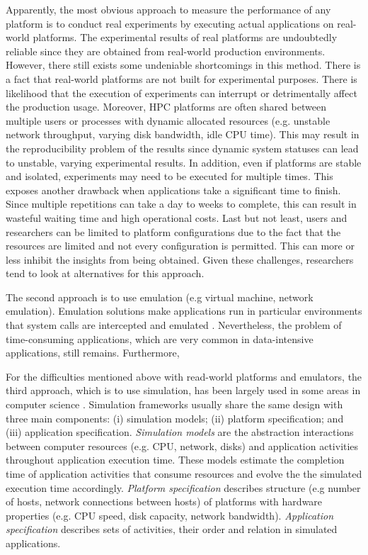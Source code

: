 Apparently, the most obvious approach to measure the performance 
of any platform is to conduct real experiments by executing actual 
applications on real-world platforms. 
The experimental results of real platforms are undoubtedly reliable 
since they are obtained from real-world production environments. 
However, there still exists some undeniable shortcomings in this method. 
There is a fact that real-world platforms are not built for 
experimental purposes. 
There is likelihood that the execution of experiments can interrupt 
or detrimentally affect the production usage. 
Moreover, HPC platforms are often shared between multiple users or processes 
with dynamic allocated resources (e.g. unstable network throughput,  
varying disk bandwidth, idle CPU time). 
This may result in the reproducibility problem of the results since 
dynamic system statuses can lead to unstable, varying experimental results. 
In addition, even if platforms are stable and isolated, experiments may need 
to be executed for multiple times. 
This exposes another drawback when applications take a significant time 
to finish. Since multiple repetitions can take a day to weeks to complete, 
this can result in wasteful waiting time and high operational costs.  
Last but not least, users and researchers can be limited to platform 
configurations due to the fact that the resources are limited and 
not every configuration is permitted. This can more or less 
inhibit the insights from being obtained. 
Given these challenges, researchers tend to look at alternatives 
for this approach. 

The second approach is to use emulation (e.g virtual machine, 
network emulation). Emulation solutions make applications run 
in particular environments that system calls are intercepted 
and emulated \cite{casanova2008simgrid}. 
Nevertheless, the problem of time-consuming applications, 
which are very common in data-intensive applications, still remains. 
Furthermore, 

For the difficulties mentioned above with read-world platforms 
and emulators, the third approach, which is to use simulation, has been  
largely used in some areas in computer science \cite{casanova2008simgrid}.  
Simulation frameworks usually share the same design with three main 
components: (i) simulation models; (ii) platform specification; 
and (iii) application specification.
\textit{Simulation models} are the abstraction interactions between computer 
resources (e.g. CPU, network, disks) and application activities throughout 
application execution time. 
These models estimate the completion time of application activities 
that consume resources and evolve the the simulated execution time accordingly.
\textit{Platform specification} describes structure (e.g number of hosts, network
connections between hosts) of platforms with hardware properties 
(e.g. CPU speed, disk capacity, network bandwidth).
\textit{Application specification} describes sets of activities, their order 
and relation in simulated applications.

